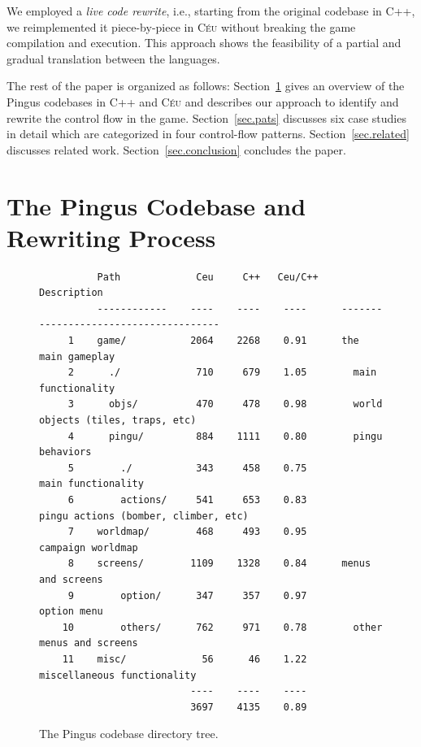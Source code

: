 \documentclass[times,twocolumn,final]{elsarticle}
\newcommand{\CEU}{\textsc{C\'{e}u}\xspace}
\begin{document}
We employed a \emph{live code rewrite}, i.e., starting from the original
codebase in C++, we reimplemented it piece-by-piece in \CEU without breaking
the game compilation and execution.
%
This approach shows the feasibility of a partial and gradual translation
between the languages.

The rest of the paper is organized as follows:
Section~\ref{sec.codebase} gives an overview of the Pingus codebases in C++ and
\CEU and describes our approach to identify and rewrite the control flow in the
game.
Section~\ref{sec.pats} discusses six case studies in detail which are
categorized in four control-flow patterns.
Section~\ref{sec.related} discusses related work.
Section~\ref{sec.conclusion} concludes the paper.

\section{The Pingus Codebase and Rewriting Process}
\label{sec.codebase}


\begin{figure}
\begin{verbatim}
          Path             Ceu     C++   Ceu/C++    Description
          ------------    ----    ----    ----      --------------------------------------
     1    game/           2064    2268    0.91      the main gameplay
     2      ./             710     679    1.05        main functionality
     3      objs/          470     478    0.98        world objects (tiles, traps, etc)
     4      pingu/         884    1111    0.80        pingu behaviors
     5        ./           343     458    0.75          main functionality
     6        actions/     541     653    0.83          pingu actions (bomber, climber, etc)
     7    worldmap/        468     493    0.95      campaign worldmap
     8    screens/        1109    1328    0.84      menus and screens
     9        option/      347     357    0.97        option menu
    10        others/      762     971    0.78        other menus and screens
    11    misc/             56      46    1.22      miscellaneous functionality
                          ----    ----    ----
                          3697    4135    0.89
\end{verbatim}
\caption{The Pingus codebase directory tree.
\label{tab.tree}
}
\end{figure}
\end{document}
